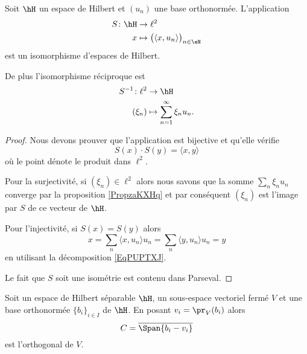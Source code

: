 \begin{corollary}       \label{CorQETwUdF}
    Soit \( \hH\) un espace de Hilbert et \( (u_n)\) une base orthonormée. L'application
    \begin{equation}
        \begin{aligned}
            S\colon \hH&\to \ell^2 \\
            x&\mapsto \big( \langle x, u_n\rangle  \big)_{n\in \eN} 
        \end{aligned}
    \end{equation}
    est un isomorphisme d'espaces de Hilbert.

    De plus l'isomorphisme réciproque est
    \begin{equation}
        \begin{aligned}
            S^{-1}\colon \ell^2&\to \hH \\
            (\xi_n)&\mapsto \sum_{n=1}^{\infty}\xi_nu_n. 
        \end{aligned}
    \end{equation}
\end{corollary}

\begin{proof}
    Nous devons prouver que l'application est bijective et qu'elle vérifie
    \begin{equation}
        S(x)\cdot S(y)=\langle x, y\rangle 
    \end{equation}
    où le point dénote le produit dans \( \ell^2\).

    Pour la surjectivité, si \( (\xi_n)\in \ell^2\) alors nous savons que la somme \( \sum_n\xi_nu_n\) converge par la proposition \ref{PropzaKXHq} et par conséquent \( (\xi_n)\) est l'image par \( S\) de ce vecteur de \( \hH\).

    Pour l'injectivité, si \( S(x)=S(y)\) alors
    \begin{equation}
        x=\sum_n\langle x, u_n\rangle u_n=\sum_n\langle y, u_n\rangle u_n=y
    \end{equation}
    en utilisant la décomposition \eqref{EqPUPTXJ}.

    Le fait que \( S\) soit une isométrie est contenu dans Parseval.
\end{proof}

\begin{proposition}      \label{PROPooPVQIooPcEFSe}
    Soit un espace de Hilbert séparable \( \hH\), un sous-espace vectoriel fermé \( V\) et une base orthonormée \( \{ b_i \}_{i\in I}\) de \( \hH\). En posant \( v_i=\pr_V(b_i)\) alors
    \begin{equation}
        C=\overline{ \Span\{ b_i-v_i \} }
    \end{equation}
    est l'orthogonal de \( V\).
\end{proposition}

